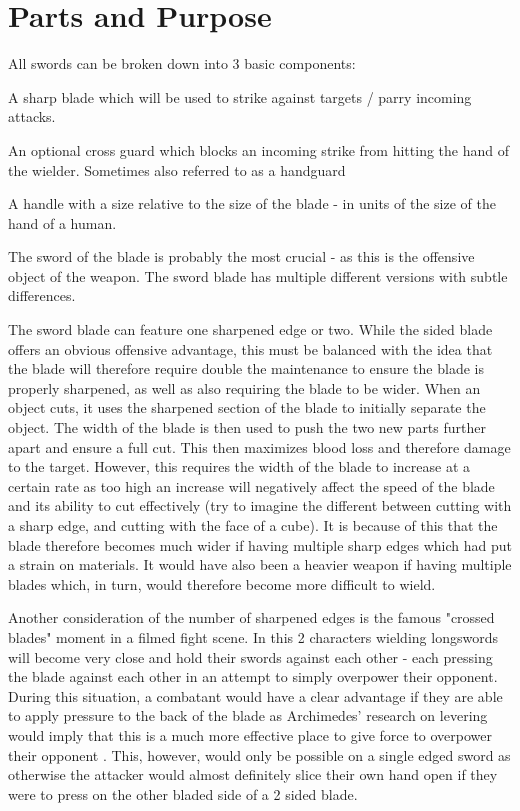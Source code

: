 \documentclass{article}
\begin{document}
\pagebreak
\section{Parts and Purpose}
All swords can be broken down into 3 basic components:\begin{list}{-}{-}
    \item A sharp blade which will be used to strike against targets / parry incoming attacks.
    \item An optional cross guard which blocks an incoming strike from hitting the hand of the wielder. Sometimes also referred to as a handguard
    \item A handle with a size relative to the size of the blade - in units of the size of the hand of a human.
\end{list}

The sword of the blade is probably the most crucial - as this is the offensive object of the weapon. The sword blade has multiple different versions with subtle differences.

The sword blade can feature one sharpened edge or two. While the sided blade offers an obvious offensive advantage, this must be balanced with the idea that the blade will therefore require double the maintenance to ensure the blade is properly sharpened, as well as also requiring the blade to be wider. When an object cuts, it uses the sharpened section of the blade to initially separate the object. The width of the blade is then used to push the two new parts further apart and ensure a full cut. This then maximizes blood loss and therefore damage to the target. However, this requires the width of the blade to increase at a certain rate as too high an increase will negatively affect the speed of the blade and its ability to cut effectively (try to imagine the different between cutting with a sharp edge, and cutting with the face of a cube). It is because of this that the blade therefore becomes much wider if having multiple sharp edges which had put a strain on materials. It would have also been a heavier weapon if having multiple blades which, in turn, would therefore become more difficult to wield.

Another consideration of the number of sharpened edges is the famous "crossed blades" moment in a filmed fight scene. In this 2 characters wielding longswords will become very close and hold their swords against each other - each pressing the blade against each other in an attempt to simply overpower their opponent. During this situation, a combatant would have a clear advantage if they are able to apply pressure to the back of the blade as Archimedes' research on levering would imply that this is a much more effective place to give force to overpower their opponent \parencite{bunn2017archimedes}. This, however, would only be possible on a single edged sword as otherwise the attacker would almost definitely slice their own hand open if they were to press on the other bladed side of a 2 sided blade.
\end{document}
